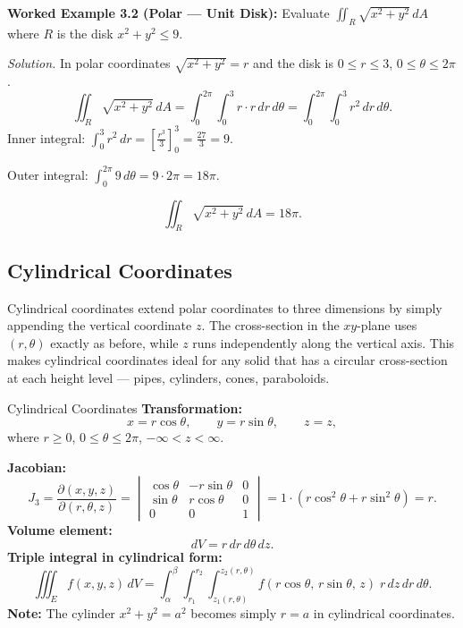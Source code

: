 \documentclass[12pt,a4paper]{article}
\begin{document}
\textbf{Worked Example 3.2 (Polar --- Unit Disk):}
Evaluate $\displaystyle\iint_R \sqrt{x^2+y^2}\,dA$ where $R$ is the disk $x^2+y^2 \leq 9$.

\textit{Solution.}  In polar coordinates $\sqrt{x^2+y^2} = r$ and the disk is $0 \leq r \leq 3$,
$0 \leq \theta \leq 2\pi$.
\[
  \iint_R \sqrt{x^2+y^2}\,dA
  = \int_0^{2\pi}\int_0^3 r \cdot r\,dr\,d\theta
  = \int_0^{2\pi}\int_0^3 r^2\,dr\,d\theta.
\]
Inner integral: $\displaystyle\int_0^3 r^2\,dr = \left[\frac{r^3}{3}\right]_0^3 = \frac{27}{3} = 9$.

Outer integral: $\displaystyle\int_0^{2\pi} 9\,d\theta = 9 \cdot 2\pi = 18\pi$.

\[
  \boxed{\iint_R \sqrt{x^2+y^2}\,dA = 18\pi.}
\]

\subsection{Cylindrical Coordinates}

Cylindrical coordinates extend polar coordinates to three dimensions by simply appending the vertical
coordinate $z$. The cross-section in the $xy$-plane uses $(r,\theta)$ exactly as before, while $z$
runs independently along the vertical axis. This makes cylindrical coordinates ideal for any solid
that has a circular cross-section at each height level --- pipes, cylinders, cones, paraboloids.

\begin{infobox}{Cylindrical Coordinates}
\textbf{Transformation:}
\[
  x = r\cos\theta, \qquad y = r\sin\theta, \qquad z = z,
\]
where $r \geq 0$, $0 \leq \theta \leq 2\pi$, $-\infty < z < \infty$.

\textbf{Jacobian:}
\[
  J_3 = \frac{\partial(x,y,z)}{\partial(r,\theta,z)}
      = \begin{vmatrix}
          \cos\theta & -r\sin\theta & 0 \\
          \sin\theta & r\cos\theta  & 0 \\
          0          & 0            & 1
        \end{vmatrix}
      = 1 \cdot (r\cos^2\theta + r\sin^2\theta) = r.
\]
\textbf{Volume element:}
\[
  dV = r\,dr\,d\theta\,dz.
\]
\textbf{Triple integral in cylindrical form:}
\[
  \iiint_E f(x,y,z)\,dV
  = \int_{\alpha}^{\beta}\int_{r_1}^{r_2}\int_{z_1(r,\theta)}^{z_2(r,\theta)}
      f(r\cos\theta,\,r\sin\theta,\,z)\;r\,dz\,dr\,d\theta.
\]
\textbf{Note:} The cylinder $x^2+y^2 = a^2$ becomes simply $r = a$ in cylindrical coordinates.
\end{infobox}
\end{document}
